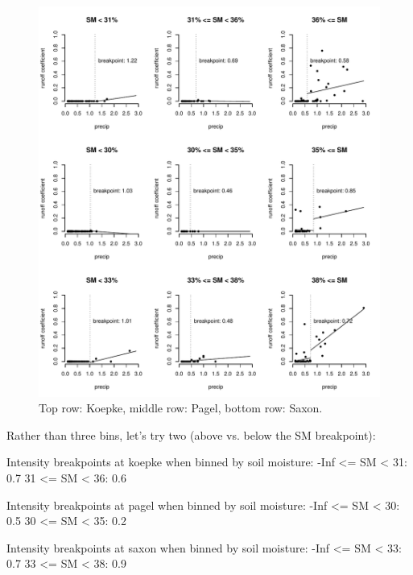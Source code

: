 \documentclass[12pt]{article}
\begin{document}
\begin{figure}
    \begin{center}
\includegraphics{runoff-precip_binned}
    \end{center}
    \caption{Top row: Koepke, middle row: Pagel, bottom row: Saxon.\label{precip_binned}}
\end{figure}


Rather than three bins, let's try two (above vs. below the SM breakpoint):\\


\begin{Schunk}
\begin{Soutput}
Intensity breakpoints at koepke when binned by soil moisture:
-Inf <= SM < 31: 0.7
31 <= SM < 36: 0.6

Intensity breakpoints at pagel when binned by soil moisture:
-Inf <= SM < 30: 0.5
30 <= SM < 35: 0.2

Intensity breakpoints at saxon when binned by soil moisture:
-Inf <= SM < 33: 0.7
33 <= SM < 38: 0.9
\end{Soutput}
\end{Schunk}
\end{document}
